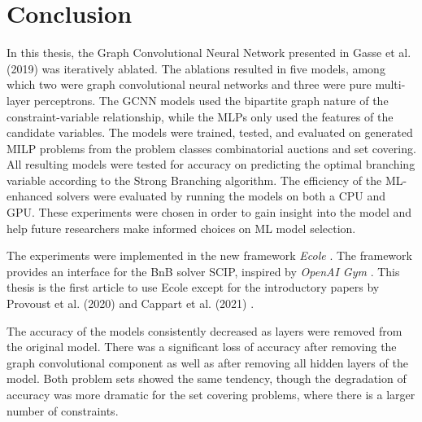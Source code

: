 \chapter{Conclusion}\label{cha:conclusion}

In this thesis, the Graph Convolutional Neural Network presented in Gasse et al. (2019) \cite{gasse2019exact} was iteratively ablated. The ablations resulted in five models, among which two were graph convolutional neural networks and three were pure multi-layer perceptrons. The \gls{GCNN} models used the bipartite graph nature of the constraint-variable relationship, while the \gls{MLP}s only used the features of the candidate variables. The models were trained, tested, and evaluated on generated \gls{MILP} problems from the problem classes combinatorial auctions and set covering. All resulting models were tested for accuracy on predicting the optimal branching variable according to the Strong Branching algorithm. The efficiency of the \gls{ML}-enhanced solvers were evaluated by running the models on both a \gls{CPU} and \gls{GPU}. These experiments were chosen in order to gain insight into the model and help future researchers make informed choices on \gls{ML} model selection. 

The experiments were implemented in the new framework \textit{\gls{Ecole}} \cite{prouvost2020ecole}. The framework provides an interface for the \gls{BnB} solver \gls{SCIP}, inspired by \textit{OpenAI Gym} \cite{brockman2016openai}.  
This thesis is the first article to use \gls{Ecole} except for the introductory papers by Provoust et al. (2020) \cite{prouvost2020ecole} and Cappart et al. (2021) \cite{cappart2021combinatorial}. 

The accuracy of the models consistently decreased as layers were removed from the original model. There was a significant loss of accuracy after removing the graph convolutional component as well as after removing all hidden layers of the model. Both problem sets showed the same tendency, though the degradation of accuracy was more dramatic for the set covering problems, where there is a larger number of constraints.  

